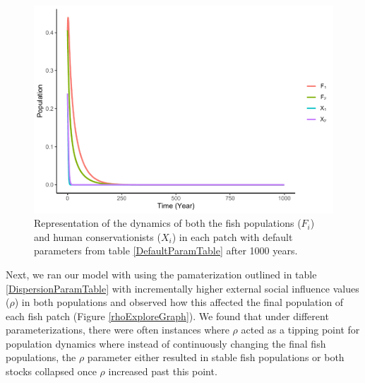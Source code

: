 \documentclass[
  12pt,
]{article}
\begin{document}
\begin{figure}
\centering
\includegraphics{Wulfing_CH2_Draft4_files/figure-latex/DispersionScenario-1.pdf}
\caption{\label{fig:DispersionScenario}Representation of the dynamics of both the fish populations (\(F_i\)) and human conservationists (\(X_i\)) in each patch with default parameters from table \ref{DefaultParamTable} after 1000 years. \label{DispersionScenario}}
\end{figure}

Next, we ran our model with using the pamaterization outlined in table \ref{DispersionParamTable} with incrementally higher external social influence values (\(\rho\)) in both populations and observed how this affected the final population of each fish patch (Figure \ref{rhoExploreGraph}). We found that under different parameterizations, there were often instances where \(\rho\) acted as a tipping point for population dynamics where instead of continuously changing the final fish populations, the \(\rho\) parameter either resulted in stable fish populations or both stocks collapsed once \(\rho\) increased past this point.
\end{document}
